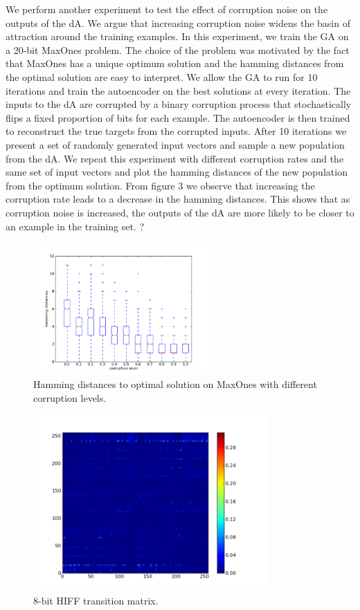 \documentclass[runningheads,a4paper]{llncs}
\begin{document}
We perform another experiment to test the effect of corruption noise on the outputs of the dA. We argue that increasing corruption noise widens the basin of attraction around the training examples. In this experiment, we train the GA on a 20-bit MaxOnes problem. The choice of the problem was motivated by the fact that MaxOnes has a unique optimum solution and the hamming distances from the optimal solution are easy to interpret. We allow the GA to run for 10 iterations and train the autoencoder on the best solutions at every iteration. The inputs to the dA are corrupted by a binary corruption process that stochastically flips a fixed proportion of bits for each example. The autoencoder is then trained to reconstruct the true targets from the corrupted inputs. After 10 iterations we present a set of randomly generated input vectors and sample a new population from the dA. We repeat this experiment with different corruption rates and the same set of input vectors and  plot the hamming distances of the new population from the optimum solution. From figure 3 we observe that increasing the corruption rate leads to a decrease in the hamming distances. This shows that as corruption noise is increased, the outputs of the dA are more likely to be closer to an example in the training set. ?
\begin{figure}[t!]
\center
\includegraphics[width = 0.6\textwidth]{images/boxplots_basins.png}

\caption{Hamming distances to optimal solution on MaxOnes with different corruption levels.}
\label{figure:hamming_max_one}
\end{figure}

\begin{figure}[t!]
\center
\includegraphics[width = 0.8\textwidth]{images/hiff-8-transition.png}

\caption{8-bit HIFF transition matrix.}
\label{figure:8bithiff}
\end{figure}
\end{document}
